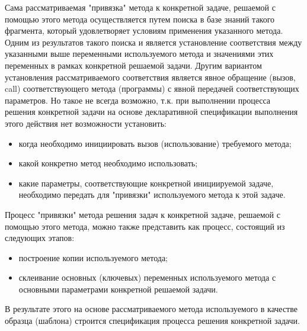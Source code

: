 Сама рассматриваемая "привязка" метода к конкретной задаче, решаемой с помощью этого метода осуществляется путем поиска
в базе знаний такого фрагмента, который удовлетворяет условиям применения указанного метода. Одним из результатов такого
поиска и является установление соответствия между указанными выше переменными используемого метода и значениями этих
переменных в рамках конкретной решаемой задачи.
Другим вариантом установления рассматриваемого соответствия является явное обращение (вызов, call) соответствующего
метода (программы) с явной передачей соответствующих параметров. Но такое не всегда возможно, т.к. при выполнении
процесса решения конкретной задачи на основе декларативной спецификации выполнения этого действия нет возможности
установить:
\begin{itemize}
    \item когда необходимо инициировать вызов (использование) требуемого метода;
    \item какой конкретно метод необходимо использовать;
    \item какие параметры, соответствующие конкретной инициируемой задаче, необходимо передать для "привязки" используемого
    метода к этой задаче.
\end{itemize}
Процесс "привязки" метода решения задач к конкретной задаче, решаемой с помощью этого метода, можно также представить
как процесс, состоящий из следующих этапов:
\begin{itemize}
    \item построение копии используемого метода;
    \item склеивание основных (ключевых) переменных используемого метода с основными параметрами конкретной решаемой задачи.
\end{itemize}
В результате этого на основе рассматриваемого метода используемого в качестве образца (шаблона) строится спецификация
процесса решения конкретной задачи.

\begin{SCn}
\begin{scnindent}
\end{scnindent}
\end{SCn}

